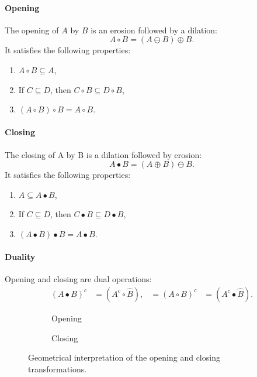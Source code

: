 \paragraph{Opening}
The opening of \(A\) by \(B\) is an erosion followed by a dilation:
\[
	A \circ B = (A \ominus B) \oplus B.
\]
It satisfies the following properties:
\begin{enumerate}[label=\textbf{(\alph*)}]
	\item $A \circ B \subseteq A$,
	\item If $C \subseteq D$, then $C \circ B \subseteq D \circ B$,
	\item $(A \circ B) \circ B = A \circ B$.
\end{enumerate}

\paragraph{Closing}
The closing of A by B is a dilation followed by erosion:
\[
	A  \bullet B = (A \oplus B) \ominus B.
\]
It satisfies the following properties:
\begin{enumerate}[label=\textbf{(\alph*)}]
	\item $A \subseteq A \bullet B$,
	\item If $C \subseteq D$, then $C \bullet B \subseteq D \bullet B$,
	\item $(A \bullet B) \bullet B = A \bullet B$.
\end{enumerate}

\paragraph{Duality}
Opening and closing are dual operations:
\begin{align*}
	(A  \bullet B)^c &= (A^c \circ \hat{B}), &=
	(A \circ B)^c &= (A^c \bullet \hat{B}).
\end{align*}

\begin{figure}
	\centering
	\begin{subfigure}[b]{.9\linewidth}
		\centering
		\caption{Opening}
	\end{subfigure}
	\begin{subfigure}[b]{.9\linewidth}
		\centering
		\caption{Closing}
	\end{subfigure}
	\caption{Geometrical interpretation of the opening and closing transformations.}
\end{figure}

